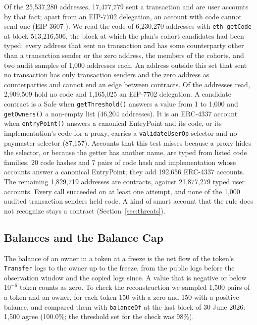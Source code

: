 \documentclass{ieeeaccess}
\begin{document}
Of the 25,537,280 addresses, 17,477,779 sent a transaction and are user accounts by that fact; apart from an EIP-7702 delegation, an account with code cannot send one (EIP-3607 \cite{feist2021eip3607}). We read the code of 6,230,270 addresses with \texttt{eth\_getCode} at block 513,216,506, the block at which the plan's cohort candidates had been typed: every address that sent no transaction and has some counterparty other than a transaction sender or the zero address, the members of the cohorts, and two audit samples of 1,000 addresses each. An address outside this set that sent no transaction has only transaction senders and the zero address as counterparties and cannot end an edge between contracts. Of the addresses read, 2,909,509 hold no code and 1,165,025 an EIP-7702 delegation. A candidate contract is a Safe when \texttt{getThreshold()} answers a value from 1 to 1,000 and \texttt{getOwners()} a non-empty list (46,204 addresses). It is an ERC-4337 account when \texttt{entryPoint()} answers a canonical EntryPoint and its code, or its implementation's code for a proxy, carries a \texttt{validateUserOp} selector and no paymaster selector (87,157). Accounts that this test misses because a proxy hides the selector, or because the getter has another name, are typed from listed code families, 20 code hashes and 7 pairs of code hash and implementation whose accounts answer a canonical EntryPoint; they add 192,656 ERC-4337 accounts. The remaining 1,829,719 addresses are contracts, against 21,877,279 typed user accounts. Every call succeeded on at least one attempt, and none of the 1,000 audited transaction senders held code. A kind of smart account that the rule does not recognize stays a contract (Section~\ref{sec:threats}).

\subsection{Balances and the Balance Cap}
\label{sec:balances}
The balance of an owner in a token at a freeze is the net flow of the token's \texttt{Transfer} logs to the owner up to the freeze, from the public logs before the observation window and the copied logs since. A value that is negative or below $10^{-6}$ token counts as zero. To check the reconstruction we sampled 1,500 pairs of a token and an owner, for each token 150 with a zero and 150 with a positive balance, and compared them with \texttt{balanceOf} at the last block of 30 June 2026: 1,500 agree (100.0\%; the threshold set for the check was 98\%).
\end{document}
